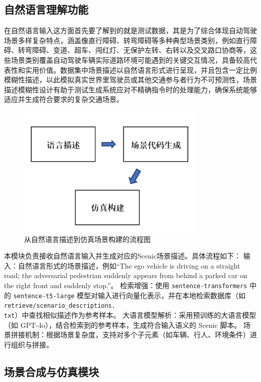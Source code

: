 \subsection{自然语言理解功能}
在自然语言输入这方面首先要了解到的就是测试数据，其是为了综合体现自动驾驶场景多样复杂特点，涵盖像直行障碍、转弯障碍等多种典型场景类别，例如直行障碍、转弯障碍、变道、超车、闯红灯、无保护左转、右转以及交叉路口协商等，这些场景类别覆盖自动驾驶车辆实际道路环境可能遇到的关键交互情况，具备较高代表性和实用价值。数据集中场景描述以自然语言形式进行呈现，并且包含一定比例模糊性描述，以此模拟真实世界里驾驶员或其他交通参与者行为不可预测性，场景描述模糊性设计有助于测试生成系统应对不精确指令时的处理能力，确保系统能够适应并生成符合要求的复杂交通场景。
\begin{figure}[H]
	\centering
	\includegraphics[width=0.8\textwidth]{"images/流程图1.pdf"}
	\caption{从自然语言描述到仿真场景构建的流程图}
	\label{fig:flowchart}
\end{figure}

本模块负责接收自然语言输入并生成对应的Scenic场景描述。具体流程如下：
输入：自然语言形式的场景描述，例如“The ego vehicle is driving on a straight road; the adversarial pedestrian suddenly appears from behind a parked car on the right front and suddenly stop.”。
检索增强：使用 \texttt{sentence-transformers} 中的 \texttt{sentence-t5-large} 模型对输入进行向量化表示，并在本地检索数据库（如 \texttt{retrieve/scenario\_descriptions.\\txt}）中查找相似描述作为参考样本。
大语言模型解析：采用预训练的大语言模型（如 GPT-4o），结合检索到的参考样本，生成符合输入语义的 Scenic 脚本。
场景拼接机制：根据场景复杂度，支持对多个子元素（如车辆、行人、环境条件）进行组织与拼接。



\subsection{场景合成与仿真模块}

